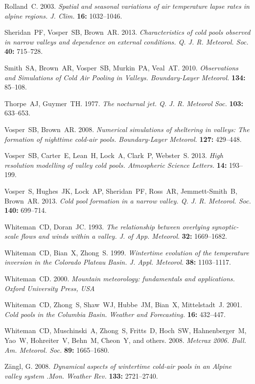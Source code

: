 \documentclass[times]{qjrms4}
\begin{document}
\begin{thebibliography}{99}
Rolland~C. 2003. \emph{Spatial and seasonal variations of air temperature lapse rates in alpine regions. J. Clim.} {\bf 16:} 1032--1046.

Sheridan~PF, Vosper~SB, Brown~AR. 2013. \emph{Characteristics of cold pools observed in narrow valleys and dependence on external conditions. Q. J. R. Meteorol. Soc.} {\bf 40:} 715–728.

Smith~SA, Brown~AR, Vosper~SB, Murkin~PA, Veal~AT. 2010. \emph{Observations and Simulations of Cold Air Pooling in Valleys. Boundary-Layer Meteorol.} {\bf 134:} 85--108.

Thorpe~AJ, Guymer~TH. 1977. \emph{The nocturnal jet. Q. J. R. Meteorol Soc.} {\bf 103:} 633--653.

Vosper~SB, Brown~AR. 2008. \emph{Numerical simulations of sheltering in valleys: The formation of nighttime cold-air pools. Boundary-Layer Meteorol.} {\bf 127:} 429--448.

Vosper~SB, Carter~E, Lean~H, Lock~A, Clark~P, Webster~S. 2013. \emph{High resolution modelling of valley cold pools. Atmospheric Science Letters.} {\bf 14:} 193--199.

Vosper~S, Hughes~JK, Lock~AP, Sheridan~PF, Ross~AR, Jemmett-Smith~B, Brown~AR. 2013. \emph{Cold pool formation in a narrow valley. Q. J. R. Meteorol. Soc.} {\bf 140:} 699--714.

Whiteman~CD, Doran~JC. 1993. \emph{The relationship between overlying synoptic-scale flows and winds within a valley. J. of App. Meteorol.} {\bf 32:} 1669--1682.

Whiteman~CD, Bian~X, Zhong~S. 1999. \emph{Wintertime evolution of the temperature inversion in the Colorado Plateau Basin. J. Appl. Meteorol.} {\bf 38:} 1103--1117.

Whiteman~CD. 2000. \emph{Mountain meteorology: fundamentals and applications. Oxford University Press, USA}

Whiteman~CD, Zhong~S, Shaw~WJ, Hubbe~JM, Bian~X, Mittelstadt~J. 2001. \emph{Cold pools in the Columbia Basin. Weather and Forecasting.} {\bf 16:} 432--447.

Whiteman~CD, Muschinski~A, Zhong~S, Fritts~D, Hoch~SW, Hahnenberger~M, Yao~W, Hohreiter~V, Behn~M, Cheon~Y, and others. 2008. \emph{Metcrax 2006. Bull. Am. Meteorol. Soc.} {\bf 89:} 1665--1680.

Z{\"a}ngl, G. 2008. \emph{Dynamical aspects of wintertime cold-air pools in an Alpine valley system .Mon. Weather Rev.} {\bf 133:} 2721--2740.

\end{thebibliography}
\end{document}

